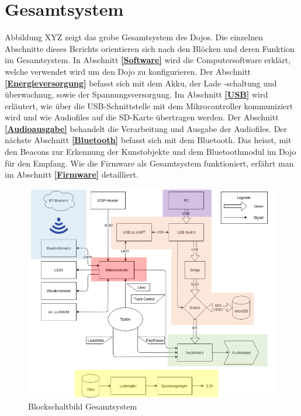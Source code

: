 \chapter{Gesamtsystem}
\thispagestyle{fancy} 

Abbildung XYZ zeigt das grobe Gesamtsystem des Dojos. Die einzelnen Abschnitte dieses Berichts orientieren sich nach den Blöcken und deren Funktion im Gesamtsystem. In Abschnitt \textbf{\ref{Software} } wird die Computersoftware erklärt, welche verwendet wird um den Dojo zu konfigurieren. Der Abschnitt \textbf{\ref{Energieversorgung} } befasst sich mit dem Akku, der Lade -schaltung und überwachnug, sowie der Spannungsversorgung. Im Abschnitt \textbf{\ref{USB} } wird erläutert, wie über die USB-Schnittstelle mit dem Mikrocontroller kommuniziert wird und wie Audiofiles auf die SD-Karte übertragen werden. Der Abschnitt \textbf{\ref{Audioausgabe} } behandelt die Verarbeitung und Ausgabe der Audiofiles. Der nächste Abschnitt \textbf{\ref{Bluetooth} } befasst sich mit dem Bluetooth. Das heisst, mit den Beacons zur Erkennung der Kunstobjekte und dem Bluetoothmodul im Dojo für den Empfang. Wie die Firmware als Gesamtsystem funktioniert, erfährt man im Abschnitt \textbf{\ref{Firmware} } detailliert.

\begin{figure}[h]
	\centering
	\includegraphics[width=\textwidth]{Bilder/Gesamtsystem.png}
	\caption{Blockschaltbild Gesamtsystem}
	\label{Blockschaltbild_Gesamtsystem}
\end{figure}
